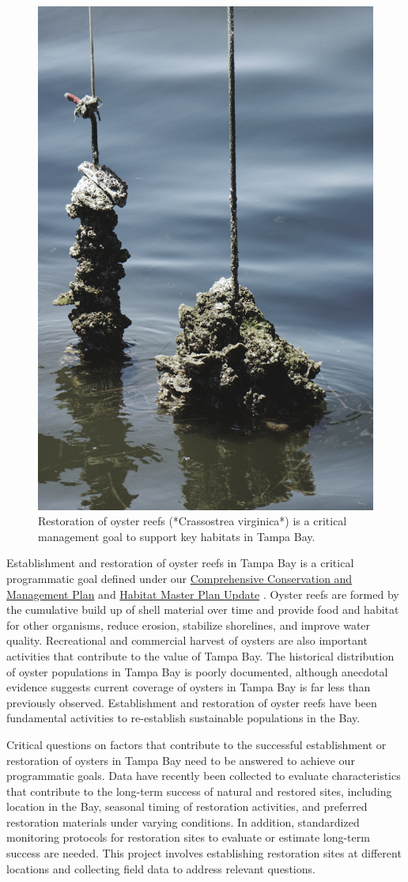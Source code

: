 \documentclass[
]{book}
\begin{document}
\begin{figure}

{\centering \includegraphics[width=0.5\linewidth]{img/oysters} 

}

\caption{Restoration of oyster reefs (*Crassostrea virginica*) is a critical management goal to support key habitats in Tampa Bay.}\label{fig:unnamed-chunk-11}
\end{figure}

Establishment and restoration of oyster reefs in Tampa Bay is a critical programmatic goal defined under our \href{https://indd.adobe.com/view/cf7b3c48-d2b2-4713-921c-c2a0d4466632}{Comprehensive Conservation and Management Plan} \citep{tbep1017} and \href{https://drive.google.com/file/d/1Hp0l_qtbxp1JxKJoGatdyuANSzQrpL0I/view}{Habitat Master Plan Update} \citep{tbep0720}. Oyster reefs are formed by the cumulative build up of shell material over time and provide food and habitat for other organisms, reduce erosion, stabilize shorelines, and improve water quality. Recreational and commercial harvest of oysters are also important activities that contribute to the value of Tampa Bay. The historical distribution of oyster populations in Tampa Bay is poorly documented, although anecdotal evidence suggests current coverage of oysters in Tampa Bay is far less than previously observed. Establishment and restoration of oyster reefs have been fundamental activities to re-establish sustainable populations in the Bay.

Critical questions on factors that contribute to the successful establishment or restoration of oysters in Tampa Bay need to be answered to achieve our programmatic goals. Data have recently been collected to evaluate characteristics that contribute to the long-term success of natural and restored sites, including location in the Bay, seasonal timing of restoration activities, and preferred restoration materials under varying conditions. In addition, standardized monitoring protocols for restoration sites to evaluate or estimate long-term success are needed. This project involves establishing restoration sites at different locations and collecting field data to address relevant questions.
\end{document}
